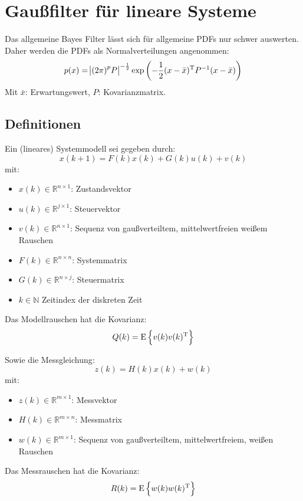 \chapter{Gaußfilter für lineare Systeme}
Das allgemeine Bayes Filter lässt sich für allgemeine PDFs nur schwer auswerten. 
Daher werden die PDFs als Normalverteilungen angenommen:
\begin{equation*}
    p(x) = \abs{{(2 \pi)}^p P}^{-\frac{1}{2}} \exp \left(-\frac{1}{2} (x - \bar{x})^\text{T} P^{-1} (x-\bar{x}) \right)
\end{equation*}
Mit $\bar{x}$: Erwartungswert, $P$: Kovarianzmatrix.

\section{Definitionen}
Ein (lineares) Systemmodell sei gegeben durch:
\begin{equation*}
    x(k+1) = F(k) x(k) + G(k) u(k) + v(k)
\end{equation*}
mit:
\begin{itemize}
    \item $x(k) \in \mathbb{R}^{n \times 1}$: Zustandsvektor
    \item $u(k) \in \mathbb{R}^{j \times 1}$: Steuervektor
    \item $v(k) \in \mathbb{R}^{n \times 1}$: Sequenz von gaußverteiltem, mittelwertfreien weißem Rauschen
    \item $F(k) \in \mathbb{R}^{n \times n}$: Systemmatrix
    \item $G(k) \in \mathbb{R}^{n \times j}$: Steuermatrix
    \item $k \in \mathbb{N}$ Zeitindex der diskreten Zeit
\end{itemize}
Das Modellrauschen hat die Kovarianz:
\begin{equation*}
    Q(k) = \operatorname*{E}\left\{v(k)v(k)^\text{T}\right\}
\end{equation*}

Sowie die Messgleichung:
\begin{equation*}
    z(k) = H(k) x(k) + w(k)
\end{equation*}
mit:
\begin{itemize}
    \item $z(k) \in \mathbb{R}^{m \times 1}$: Messvektor
    \item $H(k) \in \mathbb{R}^{m \times n}$: Messmatrix
    \item $w(k) \in \mathbb{R}^{m \times 1}$: Sequenz von gaußverteiltem, mittelwertfreiem, weißen Rauschen
\end{itemize}
Das Messrauschen hat die Kovarianz:
\begin{equation*}
    R(k) = \operatorname*{E}\left\{w(k)w(k)^\text{T}\right\}
\end{equation*}

